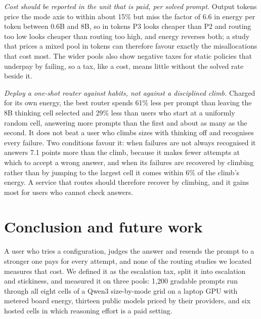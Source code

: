 \documentclass[final,5p,times,twocolumn]{elsarticle}
\theoremstyle{plain}
\begin{document}
\emph{Cost should be reported in the unit that is paid, per solved prompt.}
Output tokens price the mode axis to within about 15\% but miss the factor of
6.6 in energy per token between 0.6B and 8B, so in tokens P3 looks cheaper
than P2 and routing too low looks cheaper than routing too high, and energy
reverses both; a study that prices a mixed pool in tokens can therefore
favour exactly the misallocations that cost most. The wider pools also show
negative taxes for static policies that underpay by failing, so a tax, like a
cost, means little without the solved rate beside it.

\emph{Deploy a one-shot router against habits, not against a disciplined
climb.} Charged for its own energy, the best router spends 61\% less per
prompt than leaving the 8B thinking cell selected and 29\% less than users
who start at a uniformly random cell, answering more prompts than the first
and about as many as the second. It does not beat a user who climbs sizes
with thinking off and recognises every failure. Two conditions favour it:
when failures are not always recognised it answers 7.1 points more than the
climb, because it makes fewer attempts at which to accept a wrong answer, and
when its failures are recovered by climbing rather than by jumping to the
largest cell it comes within 6\% of the climb's energy. A service that routes
should therefore recover by climbing, and it gains most for users who cannot
check answers.

\section{Conclusion and future work}
\label{sec:conclusion}

A user who tries a configuration, judges the answer and resends the prompt to
a stronger one pays for every attempt, and none of the routing studies we
located measures that cost. We defined it as the escalation tax, split it
into escalation and stickiness, and measured it on three pools: 1{,}200
gradable prompts run through all eight cells of a Qwen3 size-by-mode grid on
a laptop GPU with metered board energy, thirteen public models priced by
their providers, and six hosted cells in which reasoning effort is a paid
setting.
\end{document}
